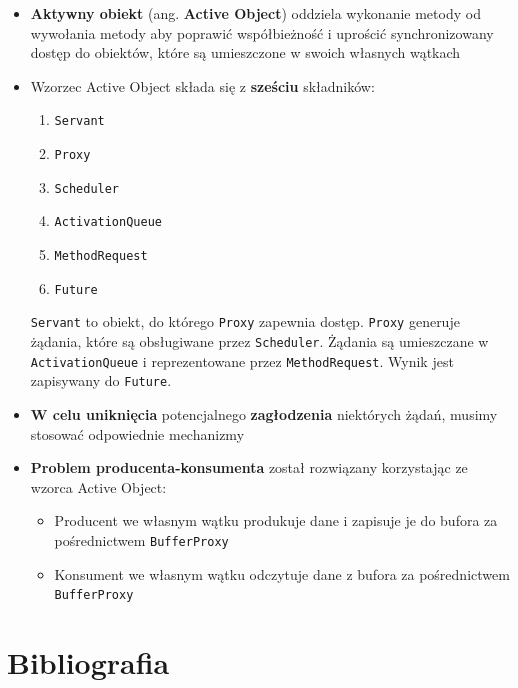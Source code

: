 \documentclass[11pt]{article}
\providecommand{\tightlist}{%
      \setlength{\itemsep}{0pt}\setlength{\parskip}{0pt}}
\begin{document}
\begin{itemize}
\item
  \textbf{Aktywny obiekt} (ang. \textbf{Active Object}) oddziela
  wykonanie metody od wywołania metody aby poprawić współbieżność i
  uprościć synchronizowany dostęp do obiektów, które są umieszczone w
  swoich własnych wątkach
\item
  Wzorzec Active Object składa się z \textbf{sześciu} składników:

  \begin{enumerate}
  \def\labelenumi{\arabic{enumi}.}
  \tightlist
  \item
    \texttt{Servant}
  \item
    \texttt{Proxy}
  \item
    \texttt{Scheduler}
  \item
    \texttt{ActivationQueue}
  \item
    \texttt{MethodRequest}
  \item
    \texttt{Future}
  \end{enumerate}

  \texttt{Servant} to obiekt, do którego \texttt{Proxy} zapewnia dostęp.
  \texttt{Proxy} generuje żądania, które są obsługiwane przez
  \texttt{Scheduler}. Żądania są umieszczane w \texttt{ActivationQueue}
  i reprezentowane przez \texttt{MethodRequest}. Wynik jest zapisywany
  do \texttt{Future}.
\item
  \textbf{W celu uniknięcia} potencjalnego \textbf{zagłodzenia}
  niektórych żądań, musimy stosować odpowiednie mechanizmy
\item
  \textbf{Problem producenta-konsumenta} został rozwiązany korzystając
  ze wzorca Active Object:

  \begin{itemize}
  \tightlist
  \item
    Producent we własnym wątku produkuje dane i zapisuje je do bufora za
    pośrednictwem \texttt{BufferProxy}
  \item
    Konsument we własnym wątku odczytuje dane z bufora za pośrednictwem
    \texttt{BufferProxy}
  \end{itemize}
\end{itemize}

    \hypertarget{bibliografia}{%
\section{Bibliografia}\label{bibliografia}}
\end{document}
